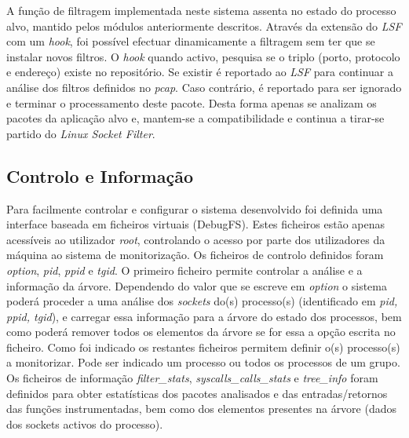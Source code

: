 \documentclass[a4paper]{llncs}
\begin{document}
A função de filtragem  implementada neste sistema assenta no estado do processo alvo, mantido pelos módulos anteriormente descritos.
 Através da extensão do \textit{LSF} com um \textit{hook}, foi possível efectuar dinamicamente a filtragem sem ter que se instalar novos filtros.
 O \textit{hook} quando activo, pesquisa se o triplo (porto, protocolo e endereço) existe no repositório.
 Se existir é reportado ao \textit{LSF} para continuar a análise dos filtros definidos no \textit{pcap}.
 Caso contrário, é reportado para ser ignorado e terminar o processamento deste pacote.
 Desta forma apenas se analizam os pacotes da aplicação alvo e, mantem-se a compatibilidade e continua a tirar-se partido do \textit{Linux Socket Filter}.



\subsection*{Controlo e Informação}
\label{sub:data_information}

Para facilmente controlar e configurar o sistema desenvolvido foi definida uma interface baseada em ficheiros virtuais (DebugFS).
 Estes ficheiros estão apenas acessíveis ao utilizador \textit{root}, controlando o acesso por parte dos utilizadores da máquina ao sistema de monitorização.
 Os ficheiros de controlo definidos foram \textit{option}, \textit{pid}, \textit{ppid} e \textit{tgid}.
 O primeiro ficheiro permite controlar a análise e a informação da árvore.
 Dependendo do valor que se escreve em \textit{option} o sistema poderá proceder a uma análise dos \textit{sockets} do(s) processo(s) (identificado em \textit{pid, ppid, tgid}), e carregar essa informação para a árvore do estado dos processos, bem como poderá remover todos os elementos da árvore se for essa a opção escrita no ficheiro.
 Como foi indicado os restantes ficheiros permitem definir o(s) processo(s) a monitorizar.
 Pode ser indicado um processo ou todos os processos de um grupo.
 Os ficheiros de informação \textit{filter\_stats}, \textit{syscalls\_calls\_stats} e \textit{tree\_info} foram definidos para obter estatísticas dos pacotes analisados e das entradas/retornos das funções instrumentadas, bem como dos elementos presentes na árvore (dados dos sockets activos do processo).
\end{document}
